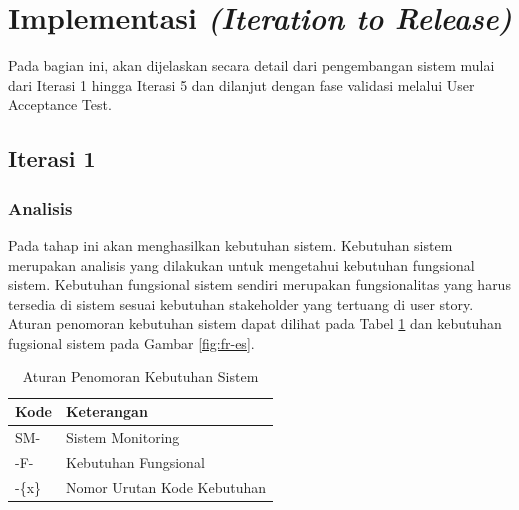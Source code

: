 \section{Implementasi \textit{(Iteration to Release)}}

Pada bagian ini, akan dijelaskan secara detail dari pengembangan sistem mulai dari Iterasi 1 hingga Iterasi 5 dan dilanjut dengan fase validasi melalui User Acceptance Test.

\subsection{Iterasi 1}

\subsubsection{Analisis}

Pada tahap ini akan menghasilkan kebutuhan sistem. Kebutuhan sistem merupakan analisis yang dilakukan untuk mengetahui kebutuhan fungsional sistem. Kebutuhan fungsional sistem sendiri merupakan fungsionalitas yang harus tersedia di sistem sesuai kebutuhan stakeholder yang tertuang di user story. Aturan penomoran kebutuhan sistem dapat dilihat pada Tabel \ref{tab:aturan-penomoran} dan kebutuhan fugsional sistem pada Gambar \ref{fig:fr-es}.

\begin{table}[!h]
    \caption{Aturan Penomoran Kebutuhan Sistem}
    \centering
    \begin{tabular}
        {
            >{\centering\arraybackslash}p{}
            >{\centering\arraybackslash}p{}
        }
        \toprule

        Kode &
        Keterangan \\ [1ex]

        \midrule

        SM- & Sistem Monitoring \\
        -F- & Kebutuhan Fungsional \\
        -\{x\} & Nomor Urutan Kode Kebutuhan \\

        \bottomrule
    \end{tabular}
    \label{tab:aturan-penomoran}
\end{table}

